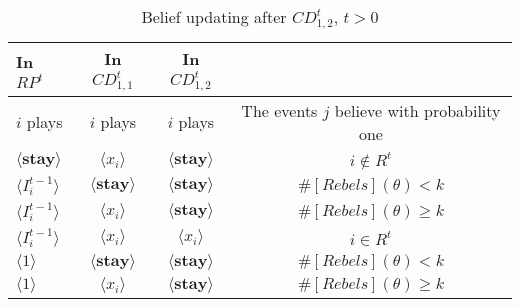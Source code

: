 \documentclass[12pt,letter]{article}
\theoremstyle{definition}
\theoremstyle{remark}
\theoremstyle{claim}
\begin{document}
\begin{table}[ht]
\caption{Belief updating after $CD^t_{1,2}$, $t>0$}
\label{Table_blf_up_cdt12}
\begin{center}
\begin{tabular}{l c c c}
In $RP^t$ 	 	&  	In $CD^t_{1,1}$		&  In $CD^t_{1,2}$	  &\\
\hline
\hline
$i$ plays 		                             &  	$i$ plays		&				$i$ plays			& The events $j$ believe with probability one  \\
\hline
$\langle  \textbf{stay} \rangle$ 	& 	$\langle x_i \rangle$	&  $\langle \textbf{stay} \rangle$ &  $i\notin R^t$ \\
$\langle  {I^{t-1}_i} \rangle$ 		&  $\langle \textbf{stay} \rangle$	&	$\langle \textbf{stay} \rangle$ &  $\#[Rebels](\theta)< k$   \\
$\langle  {I^{t-1}_i} \rangle$ 		&  $\langle x_i \rangle$	&	$\langle \textbf{stay} \rangle$ &  $\#[Rebels](\theta)\geq k$    \\
$\langle  {I^{t-1}_i} \rangle$ 		&  $\langle x_i \rangle$	&	$\langle x_i \rangle$ &  $i\in R^t$  \\
$\langle 1 \rangle$ 		             &  $\langle \textbf{stay} \rangle$	&	$\langle \textbf{stay} \rangle$ &  $\#[Rebels](\theta)< k$\\
$\langle 1 \rangle$ 		             &  $\langle x_i \rangle$	&	$\langle \textbf{stay} \rangle$ & $\#[Rebels](\theta)\geq k$
\end{tabular}
\end{center}
\end{table}
\end{document}
